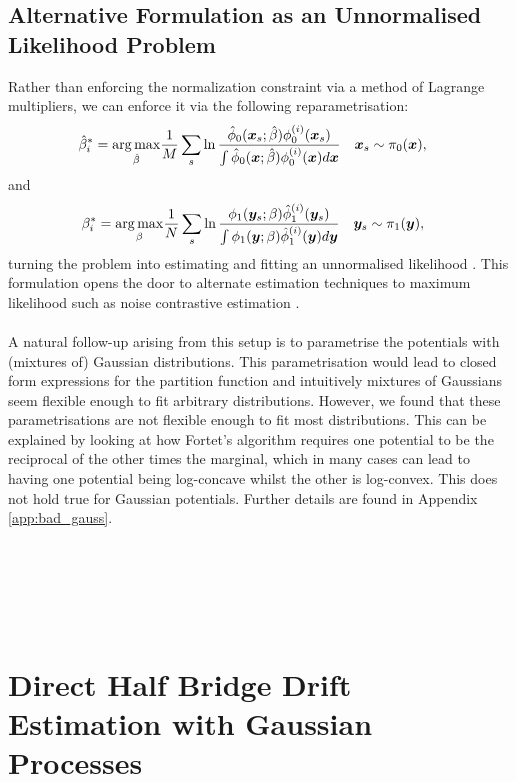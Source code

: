 \documentclass[a4paper,12pt,twoside,openright]{report}
\theoremstyle{definition}
\begin{document}
\subsection{Alternative Formulation as an Unnormalised Likelihood Problem}\label{sec:unormfit}
Rather than enforcing the normalization constraint via a method of Lagrange multipliers, we can enforce it via the following reparametrisation:
\begin{align}
    \hat{\beta}^*_i = \operatorname*{arg\,max}_{\hat{\beta} } &\frac{1}{M} \sum_s \operatorname{ln} \frac{{\hat{\phi}}_0({\bm{x}}_s; \hat{\beta} )   \phi_0^{(i)}({\bm{x}}_s)}{ \int {\hat{\phi}}_0({\bm{x}}; \hat{\beta} )   \phi_0^{(i)}({\bm{x}}) d{\bm{x}}}
    \quad {\bm{x}}_s\sim \pi_0({\bm{x}}), \nonumber 
\end{align}
and
\begin{align}
    {\beta}^*_i = \operatorname*{arg\,max}_{{\beta} } &\frac{1}{N} \sum_s \operatorname{ln}\frac{ \phi_1({\bm{y}}_s; {\beta} )   {\hat{\phi}}_1^{(i)}({\bm{y}}_s)}{ \int \phi_1({\bm{y}}; {\beta} )   {\hat{\phi}}_1^{(i)}({\bm{y}}) d{\bm{y}} }
    \quad {\bm{y}}_s\sim \pi_1({\bm{y}}), \nonumber 
\end{align}
turning the problem into estimating and fitting an unnormalised likelihood \citep{gutmann2010noise}. This formulation opens the door to alternate estimation techniques to maximum likelihood such as noise contrastive estimation \citep{gutmann2010noise}. 
\\~\\
A natural follow-up arising from this setup is to parametrise the potentials with (mixtures of) Gaussian distributions. This parametrisation would lead to closed form expressions for the partition function and intuitively mixtures of Gaussians seem flexible enough to fit arbitrary distributions. However, we found that these parametrisations are not flexible enough to fit most distributions. This can be explained by looking at how Fortet's algorithm requires one potential to be the reciprocal of the other times the marginal, which in many cases can lead to having one potential being log-concave whilst the other is log-convex. This does not hold true for Gaussian potentials. Further details are found in Appendix \ref{app:bad_gauss}.
\\~\\\\~\\\\~\\

\section{Direct Half Bridge Drift Estimation with Gaussian Processes}
\end{document}
